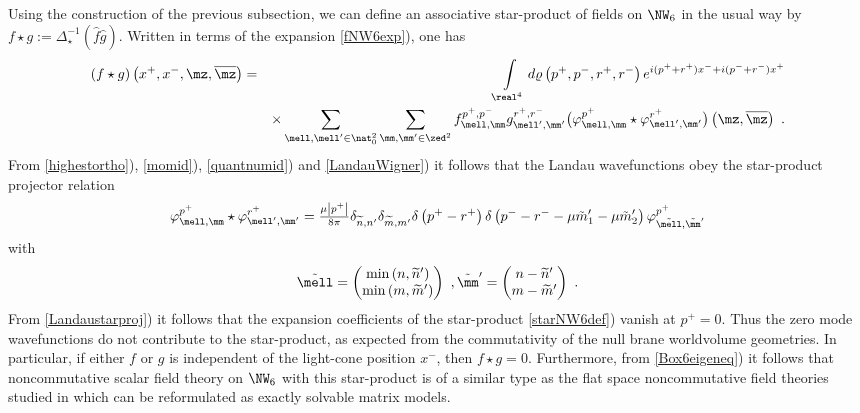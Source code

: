 Using the construction of the previous subsection, we can define an
associative star-product of fields on $\NW_6$ in the usual way by $f\star
g:=\Delta_\star^{-1}(\hat f \hat g )$. Written in terms of the
expansion \eqref{fNW6exp}), one has
\begin{eqnarray}
(f\star g)\left(x^+,x^-,\mz,\overline{\mz} \right)&=&
\int\limits_{\real^4} d\varrho\left(p^+,p^-,r^+,r^-\right) 
 e^{ i(p^++r^+)x^-+ i(p^-+r^-)x^+}\nonumber\\ &&\times 
\sum_{\mell,\mell'\in\nat_0^2} \sum_{\mm,\mm'\in\zed^2}
f_{\mell,\mm}^{p^+,p^-} 
g_{\mell',\mm'}^{r^+,r^-} \bigl(\varphi_{\mell,\mm}^{p^+}
\star\varphi_{\mell',\mm'}^{r^+}\bigr)\left(\mz,\overline{\mz} 
\right) \ .
\label{starNW6def}\end{eqnarray}
{}From \eqref{highestortho}), \eqref{momid}), \eqref{quantnumid}) and
\eqref{LandauWigner}) it follows that the Landau wavefunctions obey the
star-product projector relation \cite{LSZ1}
\begin{equation}
\varphi_{\mell,\mm}^{p^+}\star\varphi_{\mell',\mm'}^{r^+}=
\mbox{$\frac{\mu \left|p^+\right|}{8\pi}$} \delta_{\widetilde{n},n'} 
\delta_{\widetilde{m},m'} \delta\left(p^+-r^+
\right) \delta\left(p^--r^--\mu \tilde m_1'-\mu \tilde m_2'
\right) \varphi^{p^+}_{\tilde\mell,\tilde\mm'}
\label{Landaustarproj}\end{equation}
with
\begin{equation}
\tilde\mell=\begin{pmatrix}\min\left(n,\widetilde{n}^{ \prime} \right)\\
\min\left(m,\widetilde{m}^{ \prime} \right)\end{pmatrix} \ ,   
\tilde\mm'=\begin{pmatrix}n-\widetilde{n}^{ \prime} 
\\m-\widetilde{m}^{ \prime} \end{pmatrix} \ .
\label{quantnumtilde}\end{equation}
{}From \eqref{Landaustarproj}) it follows that the expansion coefficients
of the star-product \eqref{starNW6def}) vanish at
$p^+=0$. Thus the zero mode wavefunctions do not contribute to the
star-product, as expected from the commutativity of the null brane
worldvolume geometries. In particular, if either $f$ or $g$ is
independent of the light-cone position $x^-$, then $f\star
g=0$. Furthermore, from \eqref{Box6eigeneq}) it
follows that noncommutative scalar field theory on $\NW_6$ with this
star-product is of a similar type as the flat space noncommutative field
theories studied in \cite{LSZ1} which can be reformulated as exactly
solvable matrix models.

